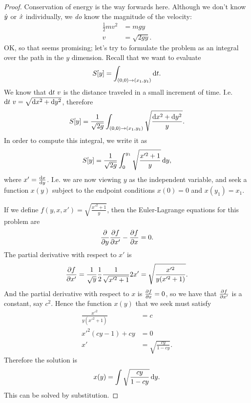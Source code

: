 \begin{proof}
  Conservation of energy is the way forwards here. Although we don't know $\dot{y}$ or $\dot{x}$ individually, we \textit{do} know the magnitude of the velocity:
  \begin{align*}
    \frac{1}{2}mv^2 &= mgy \\
    v               &= \sqrt{2gy}.
  \end{align*}
  OK, so that seems promising; let's try to formulate the problem as an integral over the path in the $y$ dimension. Recall that we want to evaluate
  \begin{align*}
    S[y] = \int_{(0, 0) \to (x_1, y_1)} \dt.
  \end{align*}
  We know that $\dt ~ v$ is the distance traveled in a small increment of time. I.e. $\dt ~ v = \sqrt{\dx^2 + \dy^2}$, therefore
  \begin{align*}
    S[y] = \frac{1}{\sqrt{2g}}\int_{(0, 0) \to (x_1, y_1)} \sqrt{\frac{\dx^2 + \dy^2}{y}}.
  \end{align*}
  In order to compute this integral, we write it as
  \begin{align*}
    S[y] = \frac{1}{\sqrt{2g}}\int_{0}^{y_1} \sqrt{\frac{x'^2 + 1}{y}}\dy,
  \end{align*}
  where $x' = \frac{\dx}{\dy}$. I.e. we are now viewing $y$ as the independent variable, and seek a function
  $x(y)$ subject to the endpoint conditions $x(0) = 0$ and $x(y_1) = x_1$.

  If we define $f(y, x, x') = \sqrt{\frac{x'^2 + 1}{y}}$, then the Euler-Lagrange equations for this problem are
  \begin{align*}
    \frac{\partial}{\partial y} \frac{\partial f}{\partial x'} - \frac{\partial f}{\partial x} = 0.
  \end{align*}
  The partial derivative with respect to $x'$ is
  \begin{align*}
    \frac{\partial f}{\partial x'} = \frac{1}{\sqrt{y}} \frac{1}{2}\frac{1}{\sqrt{x'^2 + 1}}2x' = \sqrt{\frac{x'^2}{y(x'^2 + 1)}}.
  \end{align*}
  And the partial derivative with respect to $x$ is $\frac{\partial f}{\partial x} = 0$, so we have that $\frac{\partial f}{\partial x'}$ is a constant, say $c^2$. Hence the function
  $x(y)$ that we seek must satisfy
  \begin{align*}
    \frac{x'^2}{y(x'^2 + 1)} &= c \\
    x'^2(cy - 1) + cy       &= 0 \\
    x'                     &= \sqrt{\frac{cy}{1 - cy}}.
  \end{align*}
  Therefore the solution is
  \begin{align*}
    x(y) = \int \sqrt{\frac{cy}{1 - cy}} \dy.
  \end{align*}
  This can be solved by substitution.


\end{proof}
